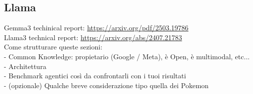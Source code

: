 \documentclass[12pt]{article}
\begin{document}
    \subsection{Llama}
    
Gemma3 techinical report: \url{https://arxiv.org/pdf/2503.19786}\\
Llama3 technical report: \url{https://arxiv.org/abs/2407.21783}\\


Come strutturare queste sezioni:\\
- Common Knowledge: propietario (Google / Meta), è Open, è multimodal, etc...\\
- Architettura\\
- Benchmark agentici così da confrontarli con i tuoi risultati\\
- (opzionale) Qualche breve considerazione tipo quella dei Pokemon\\
    
\end{document}

